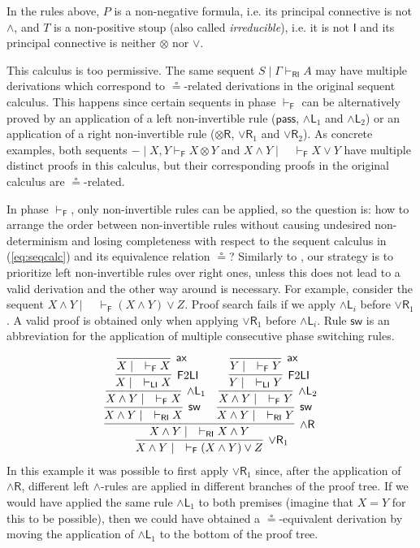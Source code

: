 \documentclass[submission,copyright,creativecommons]{eptcs}
\theoremstyle{definition}
\newcommand{\tr}{\otimes \mathsf{R}}
\newcommand{\pass}{\mathsf{pass}}
\newcommand{\andlone}{\land \mathsf{L}_{1}}
\newcommand{\andltwo}{\land \mathsf{L}_{2}}
\newcommand{\andli}{\land \mathsf{L}_{i}}
\newcommand{\andr}{\land \mathsf{R}}
\newcommand{\orrone}{\lor \mathsf{R}_{1}}
\newcommand{\orrtwo}{\lor \mathsf{R}_{2}}
\newcommand{\ax}{\mathsf{ax}}
\newcommand{\ot}{\otimes}
\newcommand{\I}{\mathsf{I}}
\newcommand{\RI}{\mathsf{RI}}
\newcommand{\LI}{\mathsf{LI}}
\newcommand{\F}{\mathsf{F}}
\newcommand{\sw}{\mathsf{sw}}
\begin{document}
In the rules above, $P$ is a non-negative formula, i.e. its principal connective is not $\land$, and $T$ is a non-positive stoup (also called \emph{irreducible}), i.e. it is not $\I$ and its principal connective is neither $\ot$ nor $\lor$.

This calculus is too permissive. The same sequent $S \mid \Gamma \vdash_{\RI} A$ may have multiple derivations which correspond to $\circeq$-related derivations in the original sequent calculus. This happens since certain sequents in phase $\vdash_\F$ can be alternatively proved by an application of a left non-invertible rule ($\pass$, $\andlone$ and $\andltwo$) or an application of a right non-invertible rule ($\tr$, $\orrone$ and $\orrtwo$). As concrete  examples, both sequents $- \mid X , Y \vdash_{\F} X \ot Y$ and $X \land Y \mid \quad \vdash_{\F} X \lor Y$ have multiple distinct proofs in this calculus, but their corresponding proofs in the original calculus are $\circeq$-related.

In phase $\vdash_\F$, only non-invertible rules can be applied, so the question is: how to arrange the order between non-invertible rules without causing undesired non-determinism and losing completeness with respect to the sequent calculus in (\ref{eq:seqcalc}) and its equivalence relation $\circeq$? Similarly to \cite{UVW:protsn}, our strategy is to prioritize left non-invertible rules over right ones, unless this does not lead to a valid derivation and the other way around is necessary.
For example, consider the sequent $X \land Y \mid \quad \vdash_{\F} (X \land Y) \lor Z$. Proof search fails if we apply $\andli$ before $\orrone$. A valid proof is obtained only when applying $\orrone$ before $\andli$. Rule $\sw$ is an abbreviation for the application of multiple consecutive phase switching rules.


\begin{equation}\label{eq:ex:focused}
  \begin{array}{c}
     \infer[\orrone]{X \land Y \mid \quad \vdash_\F (X \land Y) \lor Z}{
      \infer[\andr]{X \land Y \mid \quad \vdash_\RI X \land Y}{
        \infer[\sw]{X \land Y \mid \quad \vdash_\RI X}{
          \infer[\andlone]{X \land Y \mid \quad \vdash_\F X}{
          \infer[\F 2 \LI]{X \mid \quad \vdash_\LI X}{
          \infer[\ax]{X \mid \quad \vdash_\F X}{}
        }}}
        &
        \infer[\sw]{X \land Y \mid \quad \vdash_\RI Y}{
        \infer[\andltwo]{X \land Y \mid \quad \vdash_\F Y}{
          \infer[\F 2 \LI]{Y \mid \quad \vdash_\LI Y}{
          \infer[\ax]{Y \mid \quad \vdash_\F Y}{}
        }}}
      }
    }
  \end{array}
\end{equation}
In this example it was possible to first apply $\orrone$ since, after the application of $\andr$, different left \linebreak$\land$-rules are applied in different branches of the proof tree. If we would have applied  the same rule $\andlone$ to both premises (imagine that $X = Y$ for this to be possible), then we could have obtained a $\circeq$-equivalent derivation by moving the application of $\andlone$ to the bottom of the proof tree. 
\end{document}
